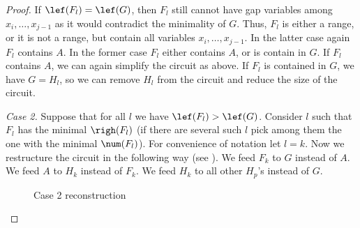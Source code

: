 \begin{proof}[Proof]
    If $\lef(F_l) = \lef(G)$, then $F_l$ still cannot have gap variables among $x_i, \ldots, x_{j-1}$ as it would contradict the minimality of $G$. Thus, $F_l$ is either a range, or it is not a range, but contain all variables $x_i, \ldots, x_{j-1}$. In the latter case again $F_l$ contains $A$. In the former case $F_l$ either contains $A$, or is contain in $G$. If $F_l$ contains $A$, we can again simplify the circuit as above. If $F_l$ is contained in $G$, we have $G=H_l$, so we can remove $H_l$ from the circuit and reduce the size of the circuit.

    \emph{Case 2.} Suppose that for all $l$ we have $\lef(F_l)>\lef(G)$. Consider $l$ such that $F_l$ has the minimal $\righ(F_l)$ (if there are several such $l$ pick among them the one with the minimal $\num(F_l)$). For convenience of notation let $l=k$. Now we restructure the circuit in the following way (see ). We feed $F_k$ to $G$ instead of $A$. We feed $A$ to $H_k$ instead of $F_k$. We feed $H_k$ to all other $H_p$'s instead of $G$.

    \begin{figure}[ht]
        \begin{center}
        \end{center}
        \caption{Case 2 reconstruction} \label{fig:after}
    \end{figure}


\end{proof}
